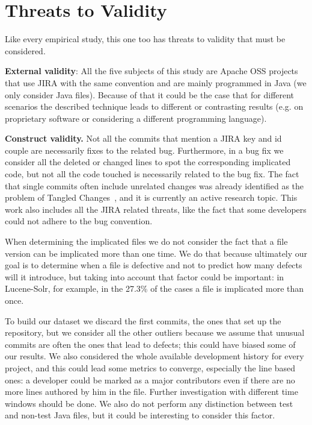 \section{Threats to Validity}

Like every empirical study, this one too has threats to validity that must be considered.

\textbf{External validity}:
All the five subjects of this study are Apache OSS projects that use JIRA with the same convention and are mainly programmed in Java (we only consider Java files). Because of that it could be the case that for different scenarios the described technique leads to different or contrasting results (e.g. on proprietary software or considering a different programming language).

\textbf{Construct validity.} 
Not all the commits that mention a JIRA key and id couple are necessarily fixes to the related bug. Furthermore, in a bug fix we consider all the deleted or changed lines to spot the corresponding implicated code, but not all the code touched is necessarily related to the bug fix. The fact that single commits often include unrelated changes was already identified as the problem of Tangled Changes~\cite{herzig2013impact}, and it is currently an active research topic. This work also includes all the JIRA related threats, like the fact that some developers could not adhere to the bug convention.

When determining the implicated files we do not consider the fact that a file version can be implicated more than one time. We do that because ultimately our goal is to determine when a file is defective and not to predict how many defects will it introduce, but taking into account that factor could be important: in Lucene-Solr, for example, in the 27.3\% of the cases a file is implicated more than once.

To build our dataset we discard the first commits, the ones that set up the repository, but we consider all the other outliers because we assume that unusual commits are often the ones that lead to defects; this could have biased some of our results. We also considered the whole available development history for every project, and this could lead some metrics to converge, especially the line based ones: a developer could be marked as a major contributors even if there are no more lines authored by him in the file. Further investigation with different time windows should be done.
We also do not perform any distinction between test and non-test Java files, but it could be interesting to consider this factor.

